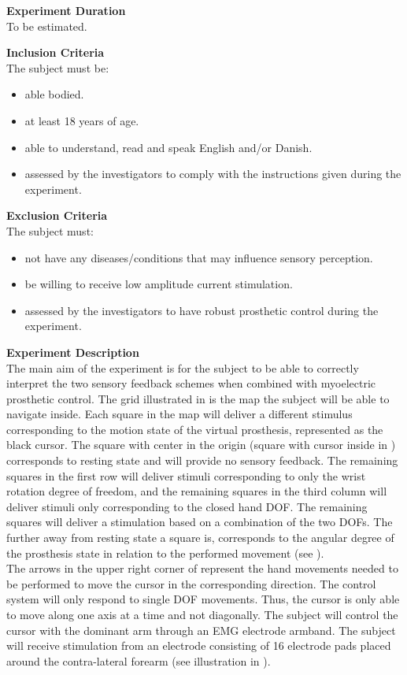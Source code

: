 \textbf{Experiment Duration} \\
To be estimated.

\textbf{Inclusion Criteria} \\
The subject must be:
\vspace{-15pt}
\begin{itemize}
	\item able bodied. %
	\item at least 18 years of age.
	\item able to understand, read and speak English and/or Danish.
	\item assessed by the investigators to comply with the instructions given during the experiment.
\end{itemize}

\textbf{Exclusion Criteria} \\
The subject must:
\vspace{-15pt}
\begin{itemize}
	\item not have any diseases/conditions that may influence sensory perception.
	\item be willing to receive low amplitude current stimulation. 
	\item assessed by the investigators to have robust prosthetic control during the experiment.
\end{itemize}

\textbf{{\Large Experiment Description}} \\
\newline
The main aim of the experiment is for the subject to be able to correctly interpret the two sensory feedback schemes when combined with myoelectric prosthetic control. The grid illustrated in  is the map the subject will be able to navigate inside. Each square in the map will deliver a different stimulus corresponding to the motion state of the virtual prosthesis, represented as the black cursor. The square with center in the origin (square with cursor inside in ) corresponds to resting state and will provide no sensory feedback. The remaining squares in the first row will deliver stimuli corresponding to only the wrist rotation degree of freedom, and the remaining squares in the third column will deliver stimuli only corresponding to the closed hand DOF. The remaining squares will deliver a stimulation based on a combination of the two DOFs. The further away from resting state a square is, corresponds to the angular degree of the prosthesis state in relation to the performed movement (see ). \\
The arrows in the upper right corner of  represent the hand movements needed to be performed to move the cursor in the corresponding direction. The control system will only respond to single DOF movements. Thus, the cursor is only able to move along one axis at a time and not diagonally. The subject will control the cursor with the dominant arm through an EMG electrode armband. The subject will receive stimulation from an electrode consisting of 16 electrode pads placed around the contra-lateral forearm (see illustration in ).

